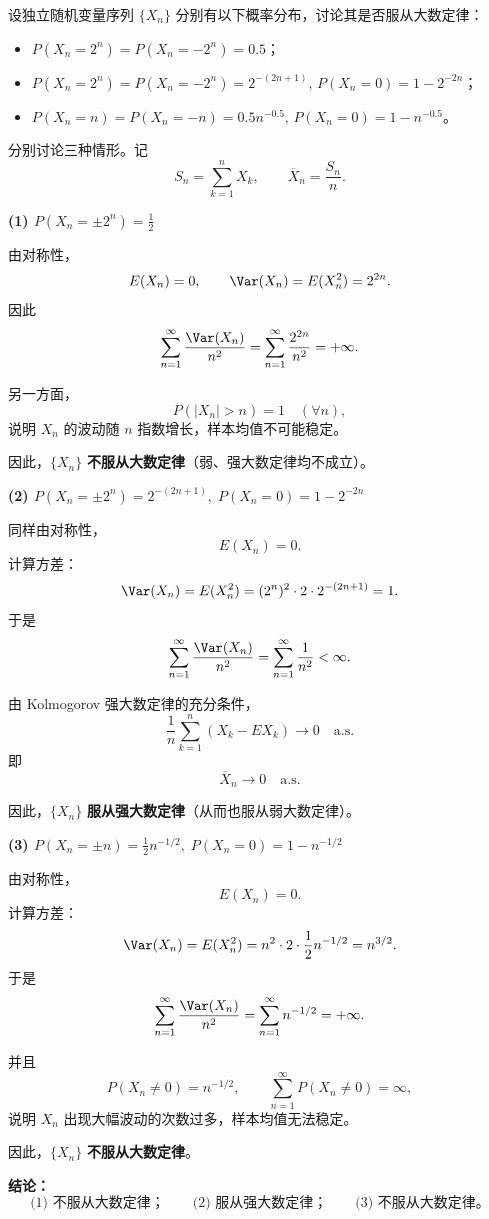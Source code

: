 \begin{homework}[5.7]
设独立随机变量序列 $\{X_n\}$ 分别有以下概率分布，讨论其是否服从大数定律：

\begin{itemize}
  \item[(1)] $P(X_n = 2^n)=P(X_n = -2^n)=0.5$；
  \item[(2)] $P(X_n = 2^n)=P(X_n = -2^n)=2^{-(2n+1)}$, 
              \quad $P(X_n=0)=1-2^{-2n}$；
  \item[(3)] $P(X_n = n)=P(X_n = -n)=0.5 n^{-0.5}$, 
              \quad $P(X_n=0)=1-n^{-0.5}$。
\end{itemize}
\end{homework}
\begin{solution}
分别讨论三种情形。记
\[
S_n=\sum_{k=1}^n X_k, \qquad \overline X_n=\frac{S_n}{n}.
\]

\medskip
\noindent
\textbf{(1) $P(X_n=\pm 2^n)=\tfrac12$}

由对称性，
\[
E(X_n)=0,
\qquad
\Var(X_n)=E(X_n^2)=2^{2n}.
\]
因此
\[
\sum_{n=1}^{\infty}\frac{\Var(X_n)}{n^2}
=
\sum_{n=1}^{\infty}\frac{2^{2n}}{n^2}
=+\infty.
\]

另一方面，
\[
P(|X_n|>n)=1 \quad (\forall n),
\]
说明 $X_n$ 的波动随 $n$ 指数增长，样本均值不可能稳定。

因此，$\{X_n\}$ \textbf{不服从大数定律}（弱、强大数定律均不成立）。

\medskip
\noindent
\textbf{(2) 
$P(X_n=\pm 2^n)=2^{-(2n+1)},\;P(X_n=0)=1-2^{-2n}$}

同样由对称性，
\[
E(X_n)=0.
\]
计算方差：
\[
\Var(X_n)=E(X_n^2)
=
(2^n)^2\cdot 2\cdot 2^{-(2n+1)}
=
1.
\]
于是
\[
\sum_{n=1}^{\infty}\frac{\Var(X_n)}{n^2}
=
\sum_{n=1}^{\infty}\frac{1}{n^2}
<\infty.
\]

由 Kolmogorov 强大数定律的充分条件，
\[
\frac{1}{n}\sum_{k=1}^n (X_k-E X_k)
\to 0 \quad \text{a.s.}
\]
即
\[
\overline X_n \to 0 \quad \text{a.s.}
\]

因此，$\{X_n\}$ \textbf{服从强大数定律}（从而也服从弱大数定律）。

\medskip
\noindent
\textbf{(3) 
$P(X_n=\pm n)=\tfrac12 n^{-1/2},\;P(X_n=0)=1-n^{-1/2}$}

由对称性，
\[
E(X_n)=0.
\]
计算方差：
\[
\Var(X_n)=E(X_n^2)
=
n^2\cdot 2\cdot \frac12 n^{-1/2}
=
n^{3/2}.
\]
于是
\[
\sum_{n=1}^{\infty}\frac{\Var(X_n)}{n^2}
=
\sum_{n=1}^{\infty} n^{-1/2}
=+\infty.
\]

并且
\[
P(X_n\neq 0)=n^{-1/2},
\qquad
\sum_{n=1}^{\infty}P(X_n\neq 0)=\infty,
\]
说明 $X_n$ 出现大幅波动的次数过多，样本均值无法稳定。

因此，$\{X_n\}$ \textbf{不服从大数定律}。

\medskip
\noindent
\textbf{结论：}
\[
\text{(1) 不服从大数定律；}\qquad
\text{(2) 服从强大数定律；}\qquad
\text{(3) 不服从大数定律。}
\]
\end{solution}
